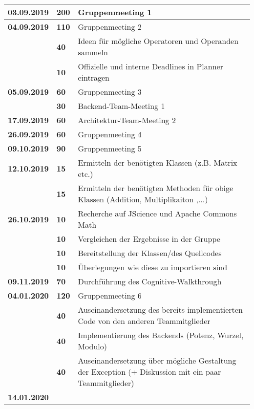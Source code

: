 {{\begin{longtable}{|l|l|p{11cm}|}
		\hline \textbf{03.09.2019} 
		& \textbf{\hfill 200} & Gruppenmeeting 1
		\\ \hline \textbf{04.09.2019}
		& \textbf{\hfill 110} & Gruppenmeeting 2 \\\cline{2-3}
		& \textbf{\hfill 40} & Ideen für mögliche Operatoren und Operanden sammeln  \\\cline{2-3}
		& \textbf{\hfill 10} & Offizielle und interne Deadlines in Planner eintragen 
		\\ \hline \textbf{05.09.2019}
		& \textbf{\hfill 60} & Gruppenmeeting 3 \\\cline{2-3}
		& \textbf{\hfill 30} & Backend-Team-Meeting 1
		\\ \hline \textbf{17.09.2019}
		& \textbf{\hfill 60} & Architektur-Team-Meeting 2
		\\ \hline \textbf{26.09.2019}
		& \textbf{\hfill 60} & Gruppenmeeting 4
		\\ \hline \textbf{09.10.2019}
		& \textbf{\hfill 90} & Gruppenmeeting 5
		\\ \hline \textbf{12.10.2019}
		& \textbf{\hfill 15} & Ermitteln der benötigten Klassen (z.B. Matrix etc.) \\\cline{2-3}
		& \textbf{\hfill 15} & Ermitteln der benötigten Methoden für obige Klassen (Addition, Multiplikaiton ,...)		
		\\ \hline \textbf{26.10.2019}
		& \textbf{\hfill 10} & Recherche auf JScience und Apache Commons Math \\\cline{2-3}
		& \textbf{\hfill 10} & Vergleichen der Ergebnisse in der Gruppe \\\cline{2-3}
		& \textbf{\hfill 10} & Bereitstellung der Klassen/des Quellcodes \\\cline{2-3}
		& \textbf{\hfill 10} & Überlegungen wie diese zu importieren sind
		\\ \hline \textbf{09.11.2019}
		& \textbf{\hfill 70} & Durchführung des Cognitive-Walkthrough 
		\\ \hline \textbf{04.01.2020}
		& \textbf{\hfill 120} & Gruppenmeeting 6 \\\cline{2-3}
		& \textbf{\hfill 40} & Auseinandersetzung des bereits implementierten Code von den anderen Teammitglieder \\\cline{2-3}
		& \textbf{\hfill 40} & Implementierung des Backends (Potenz, Wurzel, Modulo)\\\cline{2-3}
		& \textbf{\hfill 40} & Auseinandersetzung über mögliche Gestaltung der Exception
		(+ Diskussion mit ein paar Teammitglieder)
		\\ \hline \textbf{14.01.2020}

\end{longtable}}}
